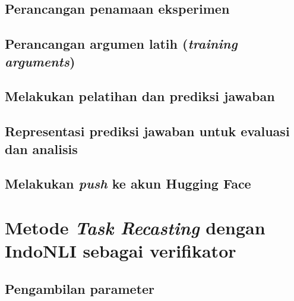 \subsection{Perancangan penamaan eksperimen}

\subsection{Perancangan argumen latih (\emph{training arguments})}

\subsection{Melakukan pelatihan dan prediksi jawaban}

\subsection{Representasi prediksi jawaban untuk evaluasi dan analisis}

\subsection{Melakukan \emph{push} ke akun Hugging Face}

\section{Metode \emph{Task Recasting} dengan IndoNLI sebagai verifikator}
\subsection{Pengambilan parameter}

